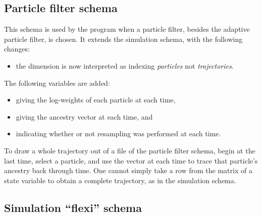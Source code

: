 \subsection{Particle filter schema}

This schema is used by the  program when a particle filter,
besides the adaptive particle filter, is chosen. It extends the simulation
schema, with the following changes:
\begin{itemize}
\item the  dimension is now interpreted as indexing \emph{particles}
  not \emph{trajectories}.
\end{itemize}

The following variables are added:
\begin{itemize}
\item {} giving the log-weights of each particle at each
  time,
\item {} giving the ancestry vector at each time, and
\item {} indicating whether or not resampling was performed
  at each time.
\end{itemize}

\begin{tip}
To draw a whole trajectory out of a file of the particle filter schema, begin
at the last time, select a particle, and use the  vector at
each time to trace that particle's ancestry back through time. One cannot
simply take a row from the matrix of a state variable to obtain a complete
trajectory, as in the simulation schema.
\end{tip}

\subsection{Simulation ``flexi'' schema}


